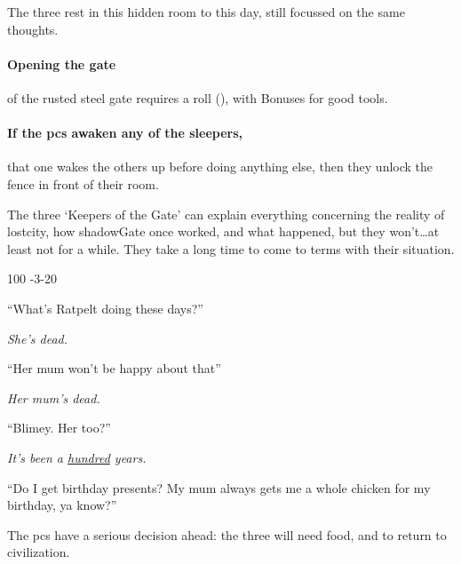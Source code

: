 \begin{multicols}{2}
\begin{exampletext}
  The three rest in this hidden room to this day, still focussed on the same thoughts.
\end{exampletext}

\paragraph{Opening the gate}
of the rusted steel gate requires a  roll (\tn[16]), with Bonuses for good tools.

\paragraph{If the \glspl{pc} awaken any of the sleepers,}
that one wakes the others up before doing anything else, then they unlock the fence in front of their room.

The three `Keepers of the Gate' can explain everything concerning the reality of \gls{lostcity}, how \gls{shadowGate} once worked, and what happened, but they won't\ldots at least not for a while.
They take a long time to come to terms with their situation.



%
  {{1}{0}{0}}%
  {{-3}{-2}{0}}%
  {%
    \Dagger
  }%
  {}%
  {\lootSmall}%
  {}%

\null
\begin{speechtext}
  ``What's Ratpelt doing these days?''

  \textit{\raggedleft{} She's dead.}

  ``Her mum won't be happy about that''

  \textit{\raggedleft{} Her mum's dead.}

  ``Blimey. Her too?''

  \textit{\raggedleft{} It's been a \underline{hundred} years.}

  ``Do I get birthday presents?
  My mum always gets me a whole chicken for my birthday, ya know?''
\end{speechtext}

The \glspl{pc} have a serious decision ahead: the three will need food, and to return to civilization.

\end{multicols}

